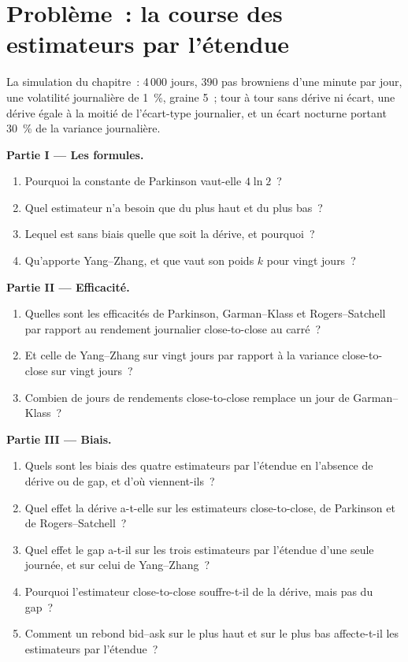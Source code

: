 \section{Problème~: la course des estimateurs par l'étendue}

\begin{problem}\label{pb:rs:price-and-volume-features:1}
La simulation du chapitre~: 4\,000 jours, 390 pas browniens d'une minute par jour, une volatilité journalière de 1~\%, graine 5~; tour à tour sans dérive ni
écart, une dérive égale à la moitié de l'écart-type journalier, et un écart nocturne portant 30~\% de la variance journalière.

\medskip\noindent\textbf{Partie I --- Les formules.}
\begin{enumerate}
\item Pourquoi la constante de Parkinson vaut-elle $4\ln2$~?
\item Quel estimateur n'a besoin que du plus haut et du plus bas~?
\item Lequel est sans biais quelle que soit la dérive, et pourquoi~?
\item Qu'apporte Yang--Zhang, et que vaut son poids $k$ pour vingt jours~?
\end{enumerate}

\medskip\noindent\textbf{Partie II --- Efficacité.}
\begin{enumerate}[resume]
\item Quelles sont les efficacités de Parkinson, Garman--Klass et Rogers--Satchell par rapport au rendement journalier close-to-close au carré~?
\item Et celle de Yang--Zhang sur vingt jours par rapport à la variance close-to-close sur vingt jours~?
\item Combien de jours de rendements close-to-close remplace un jour de Garman--Klass~?
\end{enumerate}

\medskip\noindent\textbf{Partie III --- Biais.}
\begin{enumerate}[resume]
\item Quels sont les biais des quatre estimateurs par l'étendue en l'absence de dérive ou de gap, et d'où viennent-ils~?
\item Quel effet la dérive a-t-elle sur les estimateurs close-to-close, de Parkinson et de Rogers--Satchell~?
\item Quel effet le gap a-t-il sur les trois estimateurs par l'étendue d'une seule journée, et sur celui de Yang--Zhang~?
\item Pourquoi l'estimateur close-to-close souffre-t-il de la dérive, mais pas du gap~?
\item Comment un rebond bid--ask sur le plus haut et sur le plus bas affecte-t-il les estimateurs par l'étendue~?
\end{enumerate}


\end{problem}
